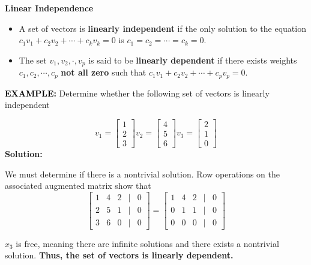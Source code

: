 \documentclass[12pt]{article}
\newcommand{\solution}{\noindent\textbf{Solution:}\par\nopagebreak}
\newcommand{\example}[1]{\noindent\textcolor{black}{\textbf{EXAMPLE:}} #1 \par}
\begin{document}
\begin{definitionbox}
    \textbf{Linear Independence}
    \begin{itemize}
        \item  A set of vectors is \textbf{linearly independent} if the only solution to the equation $c_1v_1 + c_2v_2 + \cdots + c_kv_k = 0$ is $c_1=c_2=\cdots=c_k=0$.
        \item The set ${v_1,v_2,\cdot,v_p}$ is said to be \textbf{linearly dependent} if there exists weights $c_1,c_2,\cdots,c_p$ \textbf{not all zero} such that $c_1v_1+c_2v_2+\cdots+c_pv_p=0$.  
    \end{itemize}
   
\end{definitionbox}
\vspace{20px}
\example{Determine whether the following set of vectors is linearly independent}
\[
    v_1 = \begin{bmatrix}
    
        1 \\ 2 \\ 3
    \end{bmatrix}
    v_2 = \begin{bmatrix}
        4\\5\\6
    \end{bmatrix}
    v_3 = \begin{bmatrix}
        2\\1\\0
    \end{bmatrix}
\]
\solution
We must determine if there is a nontrivial solution. Row operations on the associated augmented matrix show that
\[
\begin{bmatrix}
1 & 4 & 2 & \vert & 0\\
2 & 5 & 1 & \vert & 0\\
3 & 6 & 0 & \vert & 0
\end{bmatrix}=
\begin{bmatrix}
1 & 4 & 2 & \vert & 0\\
0 & 1 & 1 & \vert & 0\\
0 & 0 & 0 & \vert & 0
\end{bmatrix}
\]
\begin{keyconceptbox}
    $x_3$ is free, meaning there are infinite solutions and there exists a nontrivial solution.
    \textbf{Thus, the set of vectors is linearly dependent.}

\end{keyconceptbox}
\end{document}
